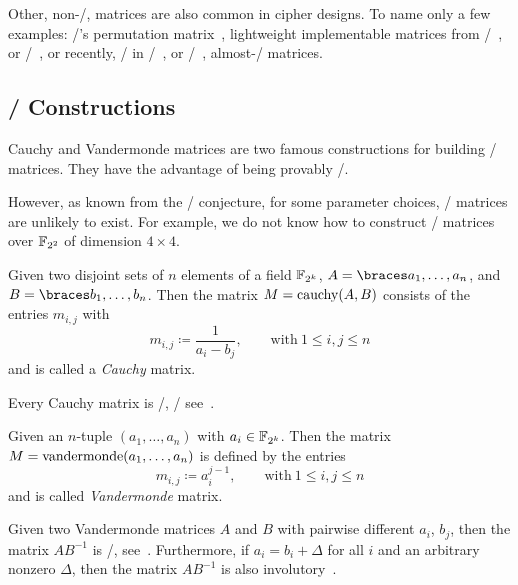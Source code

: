 Other, non-\MDS/, matrices are also common in cipher designs.
To name only a few examples: \present/'s permutation matrix~, lightweight implementable matrices from \prince/~, or \pride/~, or recently, \eg/ in \midori/~, or \qarma/~, almost-\MDS/ matrices.

\subsection{\MDS/ Constructions}
Cauchy and Vandermonde matrices are two famous constructions for building \MDS/ matrices.
They have the advantage of being provably \MDS/.

However, as known from the \MDS/ conjecture, for some parameter choices, \MDS/ matrices are unlikely to exist.
For example, we do not know how to construct \MDS/ matrices over $\mathbb{F}_{2^2}$ of dimension $4 \times 4$.

\begin{definition}
    Given two disjoint sets of $n$ elements of a field $\mathbb{F}_{2^k}$, $A = \set{a_1, \ldots, a_n}$, and $B = \set{b_1, \ldots, b_n}$.
    Then the matrix $M = \operatorname{cauchy}(A, B)$ consists of the entries $m_{i,j}$ with
    \begin{equation*}
        m_{i,j} \coloneqq \frac{1}{a_i - b_j}, \qquad \text{with}\ 1 \leq i,j \leq n
    \end{equation*}
    and is called a \emph{Cauchy} matrix.
\end{definition}

Every Cauchy matrix is \MDS/, \eg/ see~\cite[Lemma 1]{AFRICACRYPT:GupRay13}.

\begin{definition}
    Given an $n$-tuple $(a_1,\ldots,a_n)$ with $a_i \in \mathbb{F}_{2^k}$.
    Then the matrix $M = \operatorname{vandermonde}(a_1, \ldots, a_n)$ is defined by the entries
    \begin{equation*}
        m_{i,j} \coloneqq a_i^{j-1}, \qquad \text{with}\ 1 \leq i,j \leq n
    \end{equation*}
    and is called \emph{Vandermonde} matrix.
\end{definition}

Given two Vandermonde matrices $A$ and $B$ with pairwise different $a_i$, $b_j$, then the matrix $AB^{-1}$ is \MDS/, see~\cite[Theorem 2]{CL:LacFim04}.
Furthermore, if $a_i = b_i + \Delta$ for all $i$ and an arbitrary nonzero $\Delta$, then the matrix $AB^{-1}$ is also involutory~\cite{CL:LacFim04,DCC:SDMO12}.

